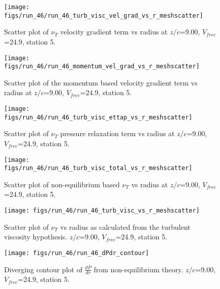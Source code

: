\begin{figure}[H]
\centering
\texttt{[image: figs/run\_46/run\_46\_turb\_visc\_vel\_grad\_vs\_r\_meshscatter]}
\caption{Scatter plot of $\nu_T$ velocity gradient term vs radius at $z/c$=9.00, $V_{free}$=24.9, station 5.}
\end{figure}


\begin{figure}[H]
\centering
\texttt{[image: figs/run\_46/run\_46\_momentum\_vel\_grad\_vs\_r\_meshscatter]}
\caption{Scatter plot of the momentum based velocity gradient term vs radius at $z/c$=9.00, $V_{free}$=24.9, station 5.}
\end{figure}


\begin{figure}[H]
\centering
\texttt{[image: figs/run\_46/run\_46\_turb\_visc\_ettap\_vs\_r\_meshscatter]}
\caption{Scatter plot of $\nu_T$ pressure relaxation term vs radius at $z/c$=9.00, $V_{free}$=24.9, station 5.}
\end{figure}


\begin{figure}[H]
\centering
\texttt{[image: figs/run\_46/run\_46\_turb\_visc\_total\_vs\_r\_meshscatter]}
\caption{Scatter plot of non-equilibrium based $\nu_T$ vs radius at $z/c$=9.00, $V_{free}$=24.9, station 5.}
\end{figure}


\begin{figure}[H]
\centering
\texttt{[image: figs/run\_46/run\_46\_turb\_visc\_vs\_r\_meshscatter]}
\caption{Scatter plot of $\nu_T$ vs radius as calculated from the turbulent viscosity hypothesis. $z/c$=9.00, $V_{free}$=24.9, station 5.}
\end{figure}


\begin{figure}[H]
\centering
\texttt{[image: figs/run\_46/run\_46\_dPdr\_contour]}
\caption{Diverging contour plot of $\frac{d\bar{P}}{dr}$ from non-equilibrium theory. $z/c$=9.00, $V_{free}$=24.9, station 5.}
\end{figure}


